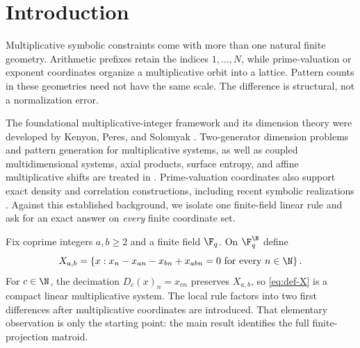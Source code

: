 \section{Introduction}

Multiplicative symbolic constraints come with more than one natural finite
geometry.  Arithmetic prefixes retain the indices $1,\ldots,N$, while
prime-valuation or exponent coordinates organize a multiplicative orbit into
a lattice.  Pattern counts in these geometries need not have the same scale.
The difference is structural, not a normalization error.

The foundational multiplicative-integer framework and its dimension theory
were developed by Kenyon, Peres, and Solomyak
\citep{KenyonPeresSolomyak2012}.  Two-generator dimension problems and pattern
generation for multiplicative systems, as well as coupled multidimensional
systems, axial products, surface entropy, and affine multiplicative shifts are
treated in
\citep{PeresSchmelingSeuretSolomyak2014,BanHuLin2019,
BanHuLai2021,BanHuLaiLiao2025,BanHuLaiLiaoAffine2025}.
Prime-valuation coordinates also
support exact density and correlation constructions, including recent
symbolic realizations \citep{MoraCuellarRojasAravenaYavicoli2026}.  Against
this established background, we isolate one finite-field linear rule and ask
for an exact answer on \emph{every} finite coordinate set.

Fix coprime integers $a,b\geq2$ and a finite field $\F_q$.  On
$\F_q^{\N}$ define
\begin{equation}\label{eq:def-X}
 X_{a,b}=\left\{x:
 x_n-x_{an}-x_{bn}+x_{abn}=0
 \text{ for every }n\in\N\right\}.
\end{equation}
For $c\in\N$, the decimation $D_c(x)_n=x_{cn}$ preserves $X_{a,b}$, so
\eqref{eq:def-X} is a compact linear multiplicative system.  The local rule
factors into two first differences after multiplicative coordinates are
introduced.  That elementary observation is only the starting point: the
main result identifies the full finite-projection matroid.

